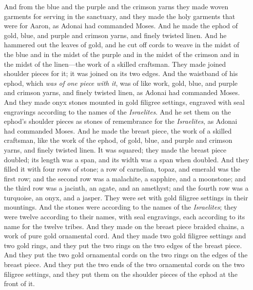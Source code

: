 \begin{biblechapter} %
 And from the blue and the purple and the crimson yarns they made woven garments for serving in the sanctuary, and they made the holy garments that were for Aaron, as Adonai had commanded Moses.
\verse And he made the ephod of gold, blue, and purple and crimson yarns, and finely twisted linen.
\verse And he hammered out the leaves of gold, and he cut off cords to weave in the midst of the blue and in the midst of the purple and in the midst of the crimson and in the midst of the linen—the work of a skilled craftsman.
\verse They made joined shoulder pieces for it; it was joined on its two edges.
\verse And the waistband of his ephod, which \textit{was of one piece with it}, was of like work, gold, blue, and purple and crimson yarns, and finely twisted linen, as Adonai had commanded Moses.
\verse And they made onyx stones mounted in gold filigree settings, engraved with seal engravings according to the names of the \textit{Israelites}.
\verse And he set them on the ephod’s shoulder pieces as stones of remembrance for the \textit{Israelites}, as Adonai had commanded Moses.
\verse And he made the breast piece, the work of a skilled craftsman, like the work of the ephod, of gold, blue, and purple and crimson yarns, and finely twisted linen.
\verse It was squared; they made the breast piece doubled; its length was a span, and its width was a span when doubled.
\verse And they filled it with four rows of stone; a row of carnelian, topaz, and emerald was the first row;
\verse and the second row was a malachite, a sapphire, and a moonstone;
\verse and the third row was a jacinth, an agate, and an amethyst;
\verse and the fourth row was a turquoise, an onyx, and a jasper. They were set with gold filigree settings in their mountings.
\verse And the stones were according to the names of the \textit{Israelites}; they were twelve according to their names, with seal engravings, each according to its name for the twelve tribes.
\verse And they made on the breast piece braided chains, a work of pure gold ornamental cord.
\verse And they made two gold filigree settings and two gold rings, and they put the two rings on the two edges of the breast piece.
\verse And they put the two gold ornamental cords on the two rings on the edges of the breast piece.
\verse And they put the two ends of the two ornamental cords on the two filigree settings, and they put them on the shoulder pieces of the ephod at the front of it.

\end{biblechapter}
